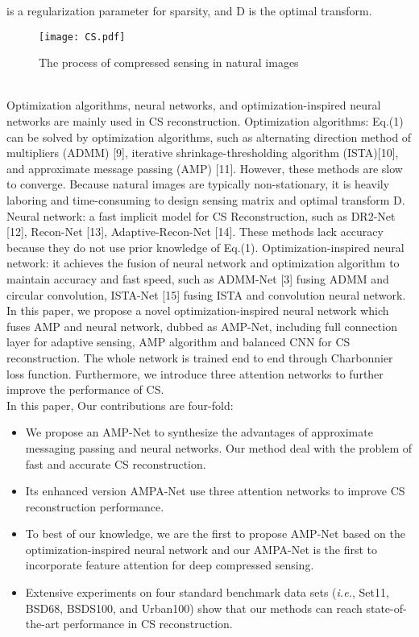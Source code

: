 \documentclass[conference]{IEEEtran}
\begin{document}
  is a regularization parameter for sparsity, and D is the optimal transform. 
\begin{figure}[h]
\centering
\texttt{[image: CS.pdf]} \caption{The process of compressed sensing in natural images}
\label{fig:CS} \end{figure}
\\Optimization algorithms, neural networks, and optimization-inspired neural networks are mainly used in CS reconstruction. Optimization algorithms: Eq.(1) can be solved by optimization algorithms, such as alternating direction method of multipliers (ADMM) [9], iterative shrinkage-thresholding algorithm (ISTA)[10], and approximate message passing (AMP) [11]. However, these methods are slow to converge. Because natural images are typically non-stationary, it is heavily laboring and time-consuming to design sensing matrix   and optimal transform D. Neural network: a fast implicit model for CS Reconstruction, such as DR2-Net [12], Recon-Net [13], Adaptive-Recon-Net [14]. These methods lack accuracy because they do not use prior knowledge of Eq.(1). Optimization-inspired neural network: it achieves the fusion of neural network and optimization algorithm to maintain accuracy and fast speed, such as ADMM-Net [3] fusing ADMM and circular convolution, ISTA-Net [15] fusing ISTA and convolution neural network. In this paper, we propose a novel optimization-inspired neural network which fuses AMP and neural network, dubbed as AMP-Net, including full connection layer for adaptive sensing, AMP algorithm  and balanced CNN for CS reconstruction. The whole network is trained end to end through Charbonnier loss function. Furthermore, we introduce three attention networks to further improve the performance of CS. 
\\In this paper, Our contributions are four-fold: 
\begin{itemize}
\item We propose an AMP-Net to synthesize the advantages of approximate messaging passing and neural networks. Our method deal with the problem of fast and accurate CS reconstruction.
\item Its enhanced version AMPA-Net use three attention networks to improve CS reconstruction performance.
\item To best of our knowledge, we are the first to propose AMP-Net based on the optimization-inspired neural network and our AMPA-Net is the first to incorporate feature attention for deep compressed sensing.
\item Extensive experiments on four standard benchmark data sets (\textit{i.e.}, Set11, BSD68, BSDS100, and Urban100) show that our methods can reach state-of-the-art performance in CS reconstruction.
\end{itemize}
\end{document}
